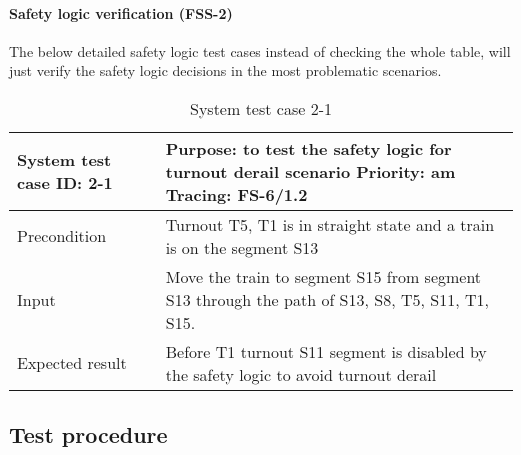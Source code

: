 \paragraph{Safety logic verification (FSS-2)} The below detailed safety logic test cases instead of checking the whole table, will just verify the safety logic decisions in the most problematic scenarios. 
\begin{table}[H]
	\caption{System test case 2-1}
	\label{table:TCase-FSS2-01}
	\begin{center}
		\renewcommand{\arraystretch}{1.8}
		\begin{tabu} 
			to 0.9 \textwidth
			{  X[0.3, l] X[l] }
			\toprule
			System test case ID: 2-1 & Purpose: to test the safety logic for turnout derail scenario  \newline Priority: am \newline Tracing: FS-6/1.2 \\ \midrule
			Precondition             & Turnout T5, T1 is in straight state and a train is on the segment S13                                           \\
			Input                    & Move the train to segment S15 from segment S13 through the path of S13, S8, T5, S11, T1, S15.                   \\
			Expected result          & Before T1 turnout S11 segment is disabled by the safety logic to avoid turnout derail                           \\ \bottomrule
		\end{tabu}
	\end{center}
\end{table}

\subsection{Test procedure}
